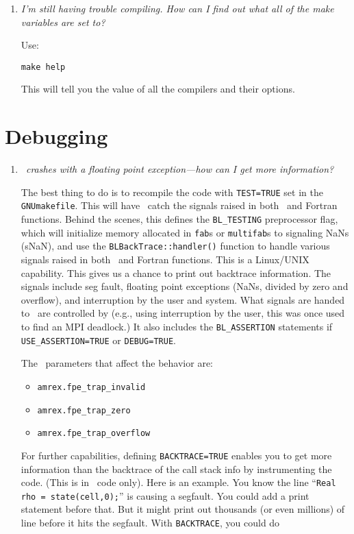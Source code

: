 \begin{enumerate}
\item {\em I'm still having trouble compiling.  How can I find out what
  all of the make variables are set to?}

  Use:
\begin{verbatim}
make help
\end{verbatim}
  This will tell you the value of all the compilers and their options.



\end{enumerate}

\section{Debugging}

\begin{enumerate}

\item {\em \castro\ crashes with a floating point exception---how can
  I get more information?}

  The best thing to do is to recompile the code with {\tt TEST=TRUE}
  set in the {\tt GNUmakefile}.  This will have \amrex\ catch the
  signals raised in both \cpp\ and Fortran functions.  Behind the
  scenes, this defines the {\tt BL\_TESTING} preprocessor flag, which
  will initialize memory allocated in {\tt fab}s or {\tt multifab}s to
  signaling NaNs (sNaN), and use the {\tt BLBackTrace::handler()}
  function to handle various signals raised in both \cpp\ and Fortran
  functions.  This is a Linux/UNIX capability.  This gives us a chance
  to print out backtrace information.  The signals include seg fault,
  floating point exceptions (NaNs, divided by zero and overflow), and
  interruption by the user and system.  What signals are handed to
  \amrex\ are controlled by \amrex (e.g., using interruption by the
  user, this was once used to find an MPI deadlock.)  It also includes
  the {\tt BL\_ASSERTION} statements if {\tt USE\_ASSERTION=TRUE} or
  {\tt DEBUG=TRUE}. 

  The \amrex\ parameters that affect the behavior are:
  \begin{itemize}
    \item {\tt amrex.fpe\_trap\_invalid}
    \item {\tt amrex.fpe\_trap\_zero}
    \item {\tt amrex.fpe\_trap\_overflow}
  \end{itemize}

  For further capabilities, defining {\tt BACKTRACE=TRUE} enables you
  to get more information than the backtrace of the call stack info by
  instrumenting the code.  (This is in \cpp\ code only). Here is an
  example.  You know the line ``{\tt Real rho = state(cell,0);}'' is
  causing a segfault.  You could add a print statement before that.
  But it might print out thousands (or even millions) of line before
  it hits the segfault.  With {\tt BACKTRACE}, you could do



\end{enumerate}
